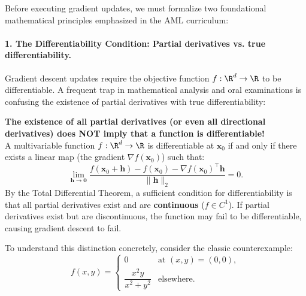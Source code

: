 Before executing gradient updates, we must formalize two foundational mathematical principles emphasized in the AML curriculum:

\paragraph{1. The Differentiability Condition: Partial derivatives vs. true differentiability.}
Gradient descent updates require the objective function $f: \R^d \to \R$ to be differentiable. A frequent trap in mathematical analysis and oral examinations is confusing the existence of partial derivatives with true differentiability:
\begin{examinsight}
\textbf{The existence of all partial derivatives (or even all directional derivatives) does NOT imply that a function is differentiable!}\\
A multivariable function $f: \R^d \to \R$ is differentiable at $\mathbf{x}_0$ if and only if there exists a linear map (the gradient $\nabla f(\mathbf{x}_0)$) such that:
\begin{equation}
\lim_{\mathbf{h} \to \mathbf{0}} \frac{f(\mathbf{x}_0 + \mathbf{h}) - f(\mathbf{x}_0) - \nabla f(\mathbf{x}_0)^\top \mathbf{h}}{\|\mathbf{h}\|_2} = 0.
\label{eq:frechet_differentiability}
\end{equation}
By the Total Differential Theorem, a sufficient condition for differentiability is that all partial derivatives exist and are \textbf{continuous} ($f \in C^1$). If partial derivatives exist but are discontinuous, the function may fail to be differentiable, causing gradient descent to fail.
\end{examinsight}

To understand this distinction concretely, consider the classic counterexample:
\begin{equation}
f(x, y) = \begin{cases} 0 & \text{at } (x, y) = (0, 0), \\ \dfrac{x^2 y}{x^2 + y^2} & \text{elsewhere}. \end{cases}
\label{eq:differentiability_counterexample}
\end{equation}


